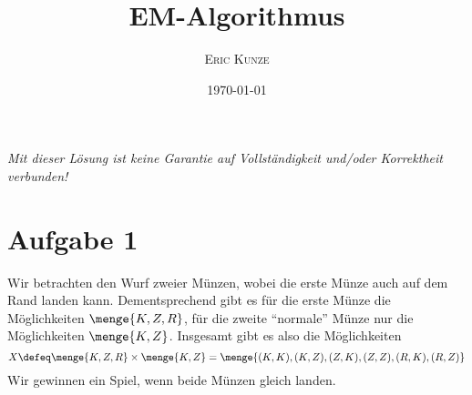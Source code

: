 \documentclass[ngerman, a4paper, 12pt]{article}
\begin{document}
	\title{\bfseries \sffamily \huge EM-Algorithmus}
	\author{\scshape Eric Kunze}
	\date{\today}
	\maketitle
	{ \footnotesize \doclicenseThis }
	
	\begin{center}
		\small \slshape Mit dieser Lösung ist keine Garantie auf Vollständigkeit und/oder Korrektheit verbunden!
	\end{center}
	
	\section*{Aufgabe 1}
	Wir betrachten den Wurf zweier Münzen, wobei die erste Münze auch auf dem Rand landen kann. Dementsprechend gibt es für die erste Münze die Möglichkeiten $\menge{K,Z,R}$, für die zweite \enquote{normale} Münze nur die Möglichkeiten $\menge{K,Z}$. Insgesamt gibt es also die Möglichkeiten
	\begin{equation*}
	X \defeq \menge{K,Z,R} \times \menge{K,Z} = \menge{(K,K), (K,Z), (Z,K), (Z,Z), (R,K), (R,Z)}
	\end{equation*}
	Wir gewinnen ein Spiel, wenn beide Münzen gleich landen.
	
\end{document}
